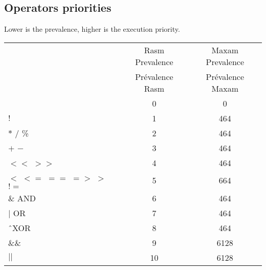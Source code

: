 \begin{xen}
\subsection{Operators priorities}
Lower is the prevalence, higher is the execution priority.
\end{xen}

\begin{tabular}{lcc}
\begin{xen}
Operators &	Rasm Prevalence	& Maxam Prevalence \\

\end{xen}
\begin{xfr}
Opérateur &	Prévalence Rasm	& Prévalence Maxam \\
\hline
\end{xfr}
$($ $)$	 & 0	& 0 \\
$!$ & 1	& 464 \\
$*$ $/$  \%	& 2	& 464 \\
$+$ $-$	& 3	& 464 \\
$<<$ $>>$	& 4	 & 464 \\
$<$ $<=$ $==$ $=>$ $>$ $!=$	& 5	& 664 \\
\& AND & 6	& 464 \\
$|$ OR & 7	& 464 \\
\^\  XOR & 8	& 464 \\
\&\& & 9 & 6128 \\
$||$ & 10	& 6128 \\
\end{tabular}
